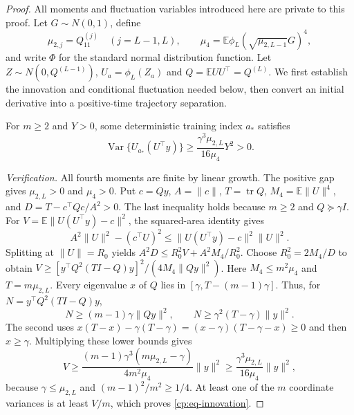 \begin{proof}
All moments and fluctuation variables introduced here are private to this
proof. Let $G\sim N(0,1)$, define
\[
 \mu_{2,j}=Q^{(j)}_{11}\quad(j=L-1,L),\qquad
 \mu_4=\mathbb E\phi_L(\sqrt{\mu_{2,L-1}}G)^4,
\]
and write $\Phi$ for the standard normal distribution function.
Let $Z\sim N(0,Q^{(L-1)})$, $U_a=\phi_L(Z_a)$ and
$Q=\mathbb E UU^\top=Q^{(L)}$. We first establish the innovation and
conditional fluctuation needed below, then convert an initial derivative
into a positive-time trajectory separation.

\begin{claim}
\label{cp:innovation}
For $m\ge2$ and $Y>0$, some deterministic training index $a_*$ satisfies
\begin{equation}
 \operatorname{Var}\{U_{a_*}(U^\top y)\}
       \ge\frac{\gamma^3\mu_{2,L}}{16\mu_4}Y^2>0.
 \label{cp:eq-innovation}
\end{equation}
\end{claim}
\emph{Verification.}
All fourth moments are finite by linear growth.  The positive gap gives
$\mu_{2,L}>0$ and $\mu_4>0$.  Put $c=Qy$, $A=\|c\|$,
$T=\operatorname{tr}Q$, $M_4=\mathbb E\|U\|^4$, and
$D=T-c^\top Qc/A^2>0$.  The last inequality holds because $m\ge2$
and $Q\succeq\gamma I$.  For $V=\mathbb E\|U(U^\top y)-c\|^2$,
the squared-area identity gives
\[
 A^2\|U\|^2-(c^\top U)^2
 \le\|U(U^\top y)-c\|^2\|U\|^2.
\]
Splitting at $\|U\|=R_0$ yields
$A^2D\le R_0^2V+A^2M_4/R_0^2$.
Choose $R_0^2=2M_4/D$ to obtain
$V\ge[y^\top Q^2(TI-Q)y]^2/(4M_4\|Qy\|^2)$.
Here $M_4\le m^2\mu_4$ and $T=m\mu_{2,L}$.
Every eigenvalue $x$ of $Q$ lies in
$[\gamma,T-(m-1)\gamma]$.  Thus, for
$N=y^\top Q^2(TI-Q)y$,
\[
 N\ge(m-1)\gamma\|Qy\|^2,\qquad
 N\ge\gamma^2(T-\gamma)\|y\|^2.
\]
The second uses
$x(T-x)-\gamma(T-\gamma)=(x-\gamma)(T-\gamma-x)\ge0$
and then $x\ge\gamma$.  Multiplying these lower bounds gives
\[
 V\ge\frac{(m-1)\gamma^3(m\mu_{2,L}-\gamma)}{4m^2\mu_4}\|y\|^2
 \ge\frac{\gamma^3\mu_{2,L}}{16\mu_4}\|y\|^2,
\]
because $\gamma\le\mu_{2,L}$ and $(m-1)^2/m^2\ge1/4$.
At least one of the $m$ coordinate variances is at least $V/m$,
which proves \eqref{cp:eq-innovation}.


\end{proof}
